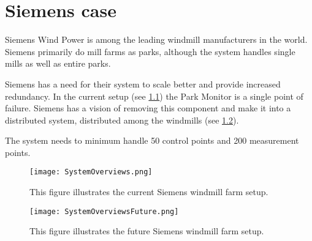 \chapter{Siemens case}

Siemens Wind Power is among the leading windmill manufacturers in the world.
Siemens primarily do mill farms as parks, although the system handles single mills as well as entire parks.

Siemens has a need for their system to scale better and provide increased redundancy.
In the current setup (see \cref{fig:currentSiemensSetup}) the Park Monitor is a single point of failure.
Siemens has a vision of removing this component and make it into a distributed system, distributed among the windmills (see \cref{fig:futureSiemensSetup}).

The system needs to minimum handle 50 control points and 200 measurement points.

\begin{figure}
	\centering
	\texttt{[image: SystemOverviews.png]} 
	\caption[Illustrates the current Siemens windmill farm setup]{
		\label{fig:currentSiemensSetup} 
		\footnotesize{%
			This figure illustrates the current Siemens windmill farm setup.
		}
	}
\end{figure}

\begin{figure}
	\centering
	\texttt{[image: SystemOverviewsFuture.png]} 
	\caption[Illustrates the future Siemens windmill farm setup]{
		\label{fig:futureSiemensSetup} 
		\footnotesize{%
			This figure illustrates the future Siemens windmill farm setup.
		}
	}
\end{figure}
